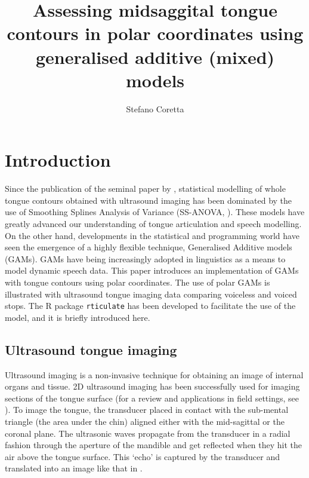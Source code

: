 \documentclass[12pt,]{article}
\title{Assessing midsaggital tongue contours in polar coordinates using
generalised additive (mixed) models}
\author{Stefano Coretta}
\date{}
\begin{document}
\maketitle

\hypertarget{introduction}{%
\section{Introduction}\label{introduction}}

Since the publication of the seminal paper by \citet{davidson2006},
statistical modelling of whole tongue contours obtained with ultrasound
imaging has been dominated by the use of Smoothing Splines Analysis of
Variance (SS-ANOVA, \citealt{gu2013}). These models have greatly
advanced our understanding of tongue articulation and speech modelling.
On the other hand, developments in the statistical and programming world
have seen the emergence of a highly flexible technique, Generalised
Additive models (GAMs). GAMs have being increasingly adopted in
linguistics as a means to model dynamic speech data. This paper
introduces an implementation of GAMs with tongue contours using polar
coordinates. The use of polar GAMs is illustrated with ultrasound tongue
imaging data comparing voiceless and voiced stops. The R package
\texttt{rticulate} has been developed to facilitate the use of the
model, and it is briefly introduced here.

\hypertarget{ultrasound-tongue-imaging}{%
\subsection{Ultrasound tongue imaging}\label{ultrasound-tongue-imaging}}

Ultrasound imaging is a non-invasive technique for obtaining an image of
internal organs and tissue. 2D ultrasound imaging has been successfully
used for imaging sections of the tongue surface (for a review and
applications in field settings, see \citealt{gick2002}). To image the
tongue, the transducer placed in contact with the sub-mental triangle
(the area under the chin) aligned either with the mid-sagittal or the
coronal plane. The ultrasonic waves propagate from the transducer in a
radial fashion through the aperture of the mandible and get reflected
when they hit the air above the tongue surface. This `echo' is captured
by the transducer and translated into an image like that in
.
\end{document}
